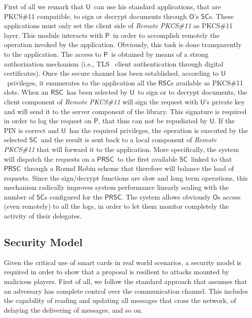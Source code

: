 \documentclass[preprint,authoryear,12pt]{elsarticle}
\newcommand{\Owner}{\ensuremath{\mathsf{O}}}
\newcommand{\User}{\ensuremath{\mathsf{U}}}
\newcommand{\Proxy}{\ensuremath{\mathsf{P}}}
\newcommand{\SC}{\ensuremath{\mathsf{SC}}}
\newcommand{\RSC}{\ensuremath{\mathsf{RSC}}}
\newcommand{\PRSC}{\ensuremath{\mathsf{PRSC}}}
\begin{document}
First of all we remark that \User\ can use his standard applications, that are PKCS\#11 compatible, to sign or decrypt documents through  \Owner 's \SC s. These applications must only set the client side of  \emph{Remote PKCS\#11}  as PKCS\#11 layer. This module  interacts with \Proxy\ in order to accomplish remotely the operation invoked by the application. Obviously, this task is done transparently to the application. The 
access to \Proxy\  is obtained by means of a strong authorization mechanism (i.e., TLS~\citep{TLS} client authentication through digital certificates). Once the secure channel has been established, according to \User\ privileges, it enumerates to the application all the \RSC s available as PKCS\#11 slots.  When an \RSC\ has been selected by \User\  to sign or to decrypt documents, the client component of \emph{Remote PKCS\#11}  will sign the request with \User 's private key and will send it to the server component of the library. This signature is required in order to log the request
on \Proxy, that thus can not be repudiated by \User. If the PIN is correct and \User\ has the required privileges, the operation is executed by the selected \SC\ and the result is sent back to a local component of  \emph{Remote PKCS\#11} that will forward it to the application. More specifically, the system will dispatch the requests on a \PRSC\ to the first available \SC\ linked to that \PRSC\ through a Round Robin scheme that therefore will balance the load of requests. Since the sign/decrypt functions are slow and long term operations, this mechanism radically improves system performance linearly scaling with the number of \SC s configured for the \PRSC. 
The system allows obviously \Owner s access (even remotely) to all the logs, in order to let them monitor completely the activity of their delegates.


\subsection{Security Model}
Given the critical use of smart cards in real world scenarios, a security model is required in order to show that a proposal is resilient to attacks mounted by malicious players. First of all, we follow the standard approach that assumes that an adversary has complete control over the communication channel. This includes the capability of reading and updating all messages that cross the network, of delaying the delivering of messages, and so on.
\end{document}
